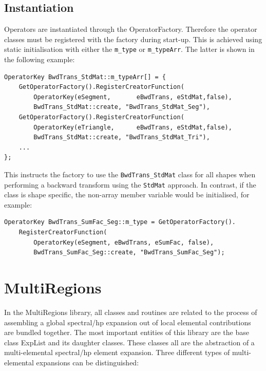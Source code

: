 \subsection{Instantiation}
Operators are instantiated through the OperatorFactory. Therefore the operator
classes must be registered with the factory during start-up. This is achieved
using static initialisation with either the \texttt{m\_type} or
\texttt{m\_typeArr}. The latter is shown in the following example:
\begin{lstlisting}[style=C++Style]
OperatorKey BwdTrans_StdMat::m_typeArr[] = {
    GetOperatorFactory().RegisterCreatorFunction(
        OperatorKey(eSegment,       eBwdTrans, eStdMat,false),
        BwdTrans_StdMat::create, "BwdTrans_StdMat_Seg"),
    GetOperatorFactory().RegisterCreatorFunction(
        OperatorKey(eTriangle,      eBwdTrans, eStdMat,false),
        BwdTrans_StdMat::create, "BwdTrans_StdMat_Tri"),
    ...
};
\end{lstlisting}
This instructs the factory to use the \texttt{BwdTrans\_StdMat} class for all
shapes when performing a backward transform using the \texttt{StdMat} approach.
In contrast, if the class is shape specific, the non-array member variable would
be initialised, for example:
\begin{lstlisting}[style=C++Style]
OperatorKey BwdTrans_SumFac_Seg::m_type = GetOperatorFactory().
    RegisterCreatorFunction(
        OperatorKey(eSegment, eBwdTrans, eSumFac, false),
        BwdTrans_SumFac_Seg::create, "BwdTrans_SumFac_Seg");
\end{lstlisting}

\section{MultiRegions}
In the MultiRegions library, all classes and routines are related to the
process of assembling a global spectral/hp expansion out of local elemental
contributions are bundled together. The most important entities of this library
are the base class ExpList and its daughter classes. These classes all are the
abstraction of a multi-elemental spectral/hp element expansion. Three different
types of multi-elemental expansions can be distinguished:

